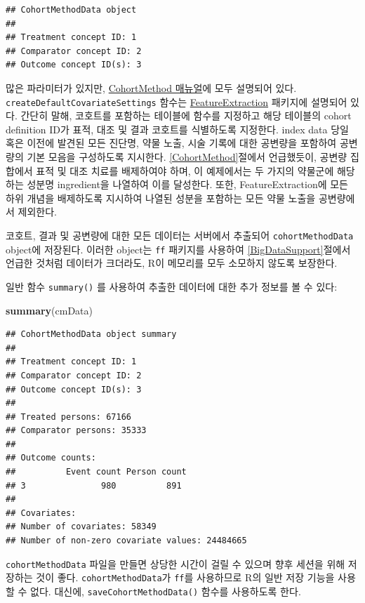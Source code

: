\documentclass[10.5pt]{book}
\newenvironment{Shaded}{\begin{snugshade}}{\end{snugshade}}
\newcommand{\KeywordTok}[1]{\textcolor[rgb]{0.13,0.29,0.53}{\textbf{#1}}}
\newcommand{\NormalTok}[1]{#1}
\theoremstyle{definition}
\theoremstyle{definition}
\theoremstyle{definition}
\theoremstyle{remark}
\begin{document}
\begin{verbatim}
## CohortMethodData object
## 
## Treatment concept ID: 1
## Comparator concept ID: 2
## Outcome concept ID(s): 3
\end{verbatim}

많은 파라미터가 있지만,
\href{https://ohdsi.github.io/CohortMethod/reference/}{CohortMethod
매뉴얼}에 모두 설명되어 있다. \texttt{createDefaultCovariateSettings}
함수는
\href{https://ohdsi.github.io/FeatureExtraction/}{FeatureExtraction}
패키지에 설명되어 있다. 간단히 말해, 코호트를 포함하는 테이블에 함수를
지정하고 해당 테이블의 cohort definition ID가 표적, 대조 및 결과
코호트를 식별하도록 지정한다. index data 당일 혹은 이전에 발견된 모든
진단명, 약물 노출, 시술 기록에 대한 공변량을 포함하여 공변량의 기본
모음을 구성하도록 지시한다. \ref{CohortMethod}절에서 언급했듯이, 공변량
집합에서 표적 및 대조 치료를 배제하여야 하며, 이 예제에서는 두 가지의
약물군에 해당하는 성분명 ingredient을 나열하여 이를 달성한다. 또한,
FeatureExtraction에 모든 하위 개념을 배제하도록 지시하여 나열된 성분을
포함하는 모든 약물 노출을 공변량에서 제외한다.

코호트, 결과 및 공변량에 대한 모든 데이터는 서버에서 추출되어
\texttt{cohortMethodData} object에 저장된다. 이러한 object는 \texttt{ff}
패키지를 사용하여 \ref{BigDataSupport}절에서 언급한 것처럼 데이터가
크더라도, R이 메모리를 모두 소모하지 않도록 보장한다.

일반 함수 \texttt{summary()} 를 사용하여 추출한 데이터에 대한 추가
정보를 볼 수 있다:

\begin{Shaded}
\begin{Highlighting}[]
\KeywordTok{summary}\NormalTok{(cmData)}
\end{Highlighting}
\end{Shaded}

\begin{verbatim}
## CohortMethodData object summary
## 
## Treatment concept ID: 1
## Comparator concept ID: 2
## Outcome concept ID(s): 3
## 
## Treated persons: 67166
## Comparator persons: 35333
## 
## Outcome counts:
##          Event count Person count
## 3               980          891
## 
## Covariates:
## Number of covariates: 58349
## Number of non-zero covariate values: 24484665
\end{verbatim}

\texttt{cohortMethodData} 파일을 만들면 상당한 시간이 걸릴 수 있으며
향후 세션을 위해 저장하는 것이 좋다. \texttt{cohortMethodData}가
\texttt{ff}를 사용하므로 R의 일반 저장 기능을 사용할 수 없다. 대신에,
\texttt{saveCohortMethodData()} 함수를 사용하도록 한다.
\end{document}
